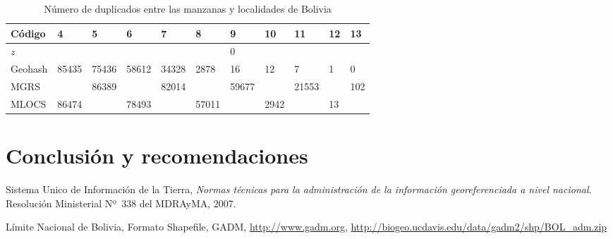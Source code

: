 \documentclass[letterpaper]{article}
\begin{document}
\begin{table}
	\centering
	\begin{tabu} to 
		\hline
		Código & 4 & 5 & 6 & 7 & 8 & 9 & 10 & 11 & 12 & 13 \\
		\hline
		\(z\) & & & & & & 0 & & & & \\
		\hline
		Geohash & 85435 & 75436 & 58612 & 34328 & 2878 & 16 & 12 & 7 & 1 & 0 \\
		\hline
		MGRS & & 86389 & & 82014 & & 59677 & & 21553 & & 102 \\
		\hline
		MLOCS & 86474 & & 78493 & & 57011 & & 2942 & & 13 & \\
		\hline
	\end{tabu}
	\caption{Número de duplicados entre las manzanas y localidades de Bolivia}
	\label{tab:duplicados}
\end{table}

\section{Conclusión y recomendaciones}



\begin{thebibliography}{99}

  Sistema Unico de Información de la Tierra,
  \emph{Normas técnicas para la administración de la información georeferenciada a nivel nacional}.
  Resolución Ministerial Nº~338 del MDRAyMA,
  2007.

  Límite Nacional de Bolivia,
  Formato Shapefile,
  GADM,
  \url{http://www.gadm.org},
  \url{http://biogeo.ucdavis.edu/data/gadm2/shp/BOL_adm.zip}

\end{thebibliography}
\end{document}
